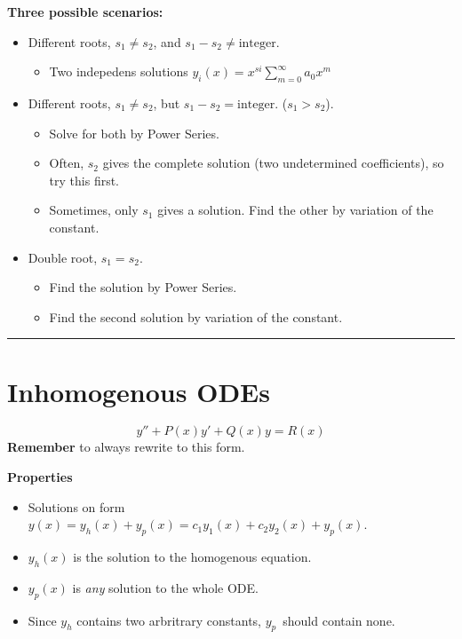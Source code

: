 \documentclass[10pt,a4paper]{article}
\newcommand{\Holine}{\rule{286pt}{3pt}}
\begin{document}
\begin{multicols}{2}
\textbf{Three possible scenarios:}
\begin{itemize}
    \item Different roots, $s_1\neq s_2$, and $s_1-s_2\neq \text{integer}$.
    \begin{itemize}
        \item Two indepedens solutions $y_i(x) = x^{si}\sum_{m=0}^\infty a_0 x^m$
    \end{itemize}
    \item Different roots, $s_1\neq s_2$, but $s_1-s_2=\text{integer}$. ($s_1>s_2$).
    \begin{itemize}
        \item Solve for both by Power Series.
        \item Often, $s_2$ gives the complete solution (two undetermined coefficients), so try this first.
        \item Sometimes, only $s_1$ gives a solution. Find the other by variation of the constant.
    \end{itemize}
    \item Double root, $s_1 = s_2$.
    \begin{itemize}
        \item Find the solution by Power Series.
        \item Find the second solution by variation of the constant.
    \end{itemize}
\end{itemize}



\Holine
\section*{Inhomogenous ODEs}
\[
    y'' + P(x)y' + Q(x)y = R(x)
\]
\textbf{Remember} to always rewrite to this form.

\textbf{Properties}
\begin{itemize}
    \item Solutions on form\\
    $y(x) = y_h(x) + y_p(x) = c_1y_1(x) + c_2y_2(x) + y_p(x)$.
    \item $y_h(x)$ is the solution to the homogenous equation.
    \item $y_p(x)$ is \textit{any} solution to the whole ODE.
    \item Since $y_h$ contains two arbritrary constants, $y_p$ should contain none.
\end{itemize}




\end{multicols}
\end{document}
